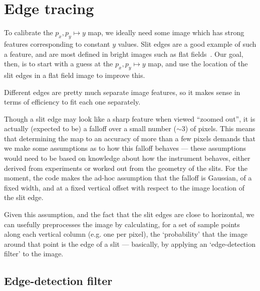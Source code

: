 \section{Edge tracing}
\label{sec:edgeTracing}

To calibrate the $p_x, p_y \mapsto y$ map, we ideally need some image
which has strong features corresponding to constant $y$ values. Slit
edges are a good example of such a feature, and are most defined in
bright images such as flat fields~\cite{surfreport}. Our goal, then, is to start with a
guess at the $p_x, p_y \mapsto y$ map, and use the location of the slit
edges in a flat field image to improve this.

Different edges are pretty much separate image features, so it makes
sense in terms of efficiency to fit each one separately.

Though a slit edge may look like a sharp feature when viewed ``zoomed
out'', it is actually (expected to be) a falloff over a small number
($\sim 3$) of pixels. This means that determining the map to an accuracy
of more than a few pixels demands that we make some assumptions as
to how this falloff behaves --- these assumptions would need to be
based on knowledge about how the instrument behaves, either derived
from experiments or worked out from the geometry of the slits. For
the moment, the code makes the ad-hoc assumption that the falloff is
Gaussian, of a fixed width, and at a fixed vertical offset with respect to
the image location of the slit edge.

Given this assumption, and the fact that the slit edges are close to
horizontal, we can usefully preprocesses the image by calculating,
for a set of sample points along each vertical column (e.g. one per pixel),
the `probability' that the image around that point is the edge of a slit
--- basically, by applying an `edge-detection filter' to the image.

\subsection{Edge-detection filter}

